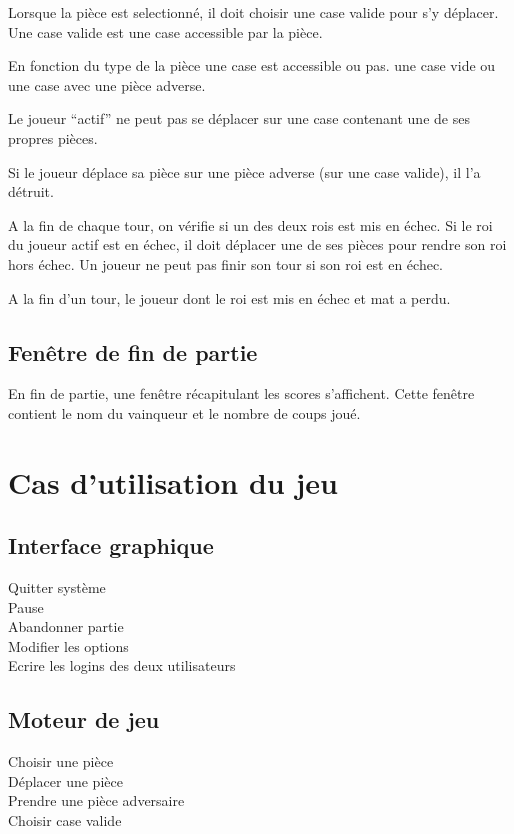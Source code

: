 \documentclass[12pt,a4paper]{report}
\begin{document}
Lorsque la pièce est selectionné, il doit choisir une case valide pour s'y déplacer. Une case valide est une case accessible par la pièce.

En fonction du type de la pièce une case est accessible ou pas. une case vide ou une case avec une pièce adverse.

Le joueur ``actif'' ne peut pas se déplacer sur une case contenant une de ses propres pièces.

Si le joueur déplace sa pièce sur une pièce adverse (sur une case valide), il l’a détruit.

A la fin de chaque tour, on vérifie si un des deux rois est mis en échec. Si le roi du joueur actif est en échec,
il doit déplacer une de ses pièces pour rendre son roi hors échec. Un joueur ne peut pas finir son tour si son roi est en échec.

A la fin d’un tour, le  joueur dont le roi est mis en échec et mat a perdu.

\section*{Fenêtre de fin de partie}
En fin de partie, une fenêtre récapitulant les scores s’affichent. Cette fenêtre contient le nom du vainqueur et le nombre de coups joué.

\maketitle
\chapter*{Cas d'utilisation du jeu}

\section*{Interface graphique} 
Quitter système
\\Pause
\\Abandonner partie
\\Modifier les options
\\Ecrire les logins des deux utilisateurs

\section*{Moteur de jeu}
Choisir une pièce
\\Déplacer une pièce
\\Prendre une pièce adversaire
\\Choisir case valide
\end{document}
